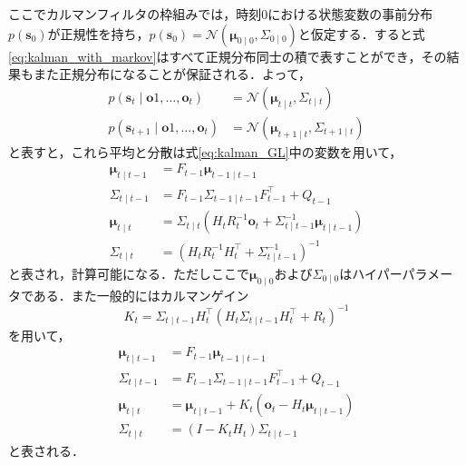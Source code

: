         ここでカルマンフィルタの枠組みでは，時刻$0$における状態変数の事前分布$p(\bm{s}_0)$が正規性を持ち，$p(\bm{s}_0) = \mathcal{N}(\bm{\mu}_{0 \mid 0}, \Sigma_{0 \mid 0})$と仮定する．すると式\ref{eq:kalman_with_markov}はすべて正規分布同士の積で表すことができ，その結果もまた正規分布になることが保証される．よって，
        \begin{equation}
            \label{eq:normal_dist_representation}
            \begin{aligned}
                p(\bm{s}_t \mid \bm{o}1, \dots, \bm{o}_t)& = \mathcal{N}\left(\bm{\mu}_{t \mid t}, \Sigma_{t \mid t}\right)
                \\ p(\bm{s}_{t+1} \mid \bm{o}1, \dots, \bm{o}_t) &= \mathcal{N}\left(\bm{\mu}_{t+1 \mid t}, \Sigma_{t+1 \mid t}\right)
            \end{aligned}
        \end{equation}
        と表すと，これら平均と分散は式\ref{eq:kalman_GL}中の変数を用いて，
        \begin{equation}
            \label{eq:estimation_equations}
            \begin{aligned}
                \bm{\mu}_{t \mid t-1} &= F_{t-1} \bm{\mu}_{t-1 \mid t-1}
                \\\Sigma_{t \mid t-1} &= F_{t-1} \Sigma_{t-1 \mid t-1} F_{t-1}^{\top} + Q_{t-1}
                \\\bm{\mu}_{t \mid t} &= \Sigma_{t \mid t} \left( H_t R_t^{-1} \bm{o}_t + \Sigma_{t \mid t-1}^{-1} \bm{\mu}_{t \mid t-1} \right)
                \\\Sigma_{t \mid t} &= \left( H_t R_t^{-1} H_t^{\top} + \Sigma_{t \mid t-1}^{-1}\right)^{-1}
            \end{aligned}
        \end{equation}
        と表され，計算可能になる．ただしここで$\bm{\mu}_{0 \mid 0}$および$\Sigma_{0 \mid 0}$はハイパーパラメータである．また一般的にはカルマンゲイン
        \begin{equation}
            \label{eq:kalman_gain}
            K_t = \Sigma_{t \mid t-1} H_t^{\top} \left(H_t \Sigma_{t \mid t-1} H_t^{\top} + R_t\right)^{-1}
        \end{equation}
        を用いて，
        \begin{equation}
            \label{eq:estimation_equations_with_K}
            \begin{aligned}
                \bm{\mu}_{t \mid t-1} &= F_{t-1} \bm{\mu}_{t-1 \mid t-1}
                \\\Sigma_{t \mid t-1} &= F_{t-1} \Sigma_{t-1 \mid t-1} F_{t-1}^{\top} + Q_{t-1}
                \\\bm{\mu}_{t \mid t} &= \bm{\mu}_{t \mid t-1} + K_t \left(\bm{o}_t - H_t \bm{\mu}_{t \mid t-1}\right)
                \\\Sigma_{t \mid t} &= (I - K_t H_t) \Sigma_{t \mid t-1}
            \end{aligned}                    
        \end{equation}
        と表される．

